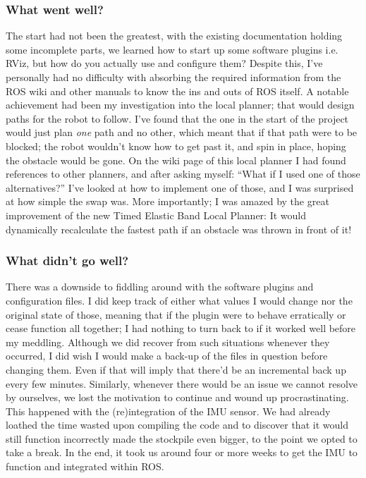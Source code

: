 \subsubsection{What went well?}
The start had not been the greatest, with the existing documentation holding some incomplete parts, we learned how to start up some software plugins i.e. RViz, but how do you actually use and configure them? 
Despite this, I've personally had no difficulty with absorbing the required information from the ROS wiki and other manuals to know the ins and outs of ROS itself. 
A notable achievement had been my investigation into the local planner; that would design paths for the robot to follow.
I've found that the one in the start of the project would just plan \textit{one} path and no other, which meant that if that path were to be blocked; the robot wouldn't know how to get past it, and spin in place, hoping the obstacle would be gone.
On the wiki page of this local planner I had found references to other planners, and after asking myself: ``What if I used one of those alternatives?'' I've looked at how to implement one of those, and I was surprised at how simple the swap was. 
More importantly; I was amazed by the great improvement of the new Timed Elastic Band Local Planner: It would dynamically recalculate the fastest path if an obstacle was thrown in front of it!

\subsubsection{What didn't go well?}
There was a downside to fiddling around with the software plugins and configuration files.
I did keep track of either what values I would change nor the original state of those, meaning that if the plugin were to behave erratically or cease function all together; I had nothing to turn back to if it worked well before my meddling. 
Although we did recover from such situations whenever they occurred, I did wish I would make a back-up of the files in question before changing them.
Even if that will imply that there'd be an incremental back up every few minutes.
Similarly, whenever there would be an issue we cannot resolve by ourselves, we lost the motivation to continue and wound up procrastinating. 
This happened with the (re)integration of the IMU sensor. 
We had already loathed the time wasted upon compiling the code and to discover that it would still function incorrectly made the stockpile even bigger, to the point we opted to take a break.
In the end, it took us around four or more weeks to get the IMU to function and integrated within ROS.

